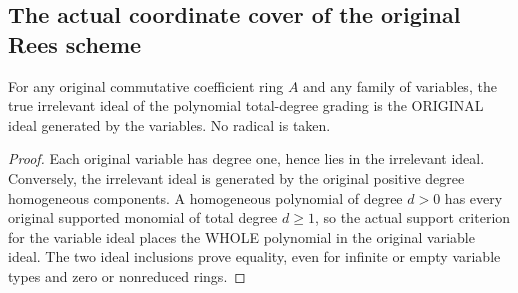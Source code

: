 \subsection{The actual coordinate cover of the original Rees scheme}

\begin{theorem}
\label{scheme:polynomial-proj-coordinate-irrelevant}
\leanok
For any original commutative coefficient ring $A$ and any family of
variables, the true irrelevant ideal of the polynomial total-degree grading
is the ORIGINAL ideal generated by the variables. No radical is taken.
\end{theorem}
\begin{proof}
Each original variable has degree one, hence lies in the irrelevant ideal.
Conversely, the irrelevant ideal is generated by the original positive
degree homogeneous components. A homogeneous polynomial of degree $d>0$
has every original supported monomial of total degree $d\ge1$, so the
actual support criterion for the variable ideal places the WHOLE polynomial
in the original variable ideal. The two ideal inclusions prove equality,
even for infinite or empty variable types and zero or nonreduced rings.
\end{proof}

